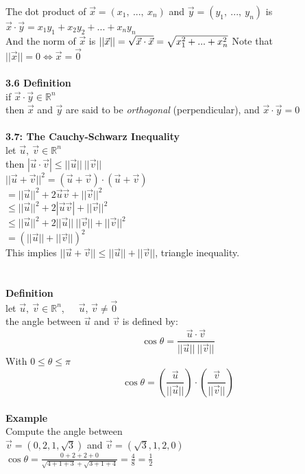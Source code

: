 \documentclass[]{article}
\begin{document}
		The dot product of $\vec{x}=(x_1,~...,~x_n)$ and $\vec{y}=(y_1,~...,~y_n)$ is\\
		$\vec{x}\cdot\vec{y}=x_1y_1+x_2y_2+...+x_ny_n$\\
		And the norm of $\vec{x}$ is $||\vec{x}||=\sqrt{\vec{x}\cdot\vec{x}}\\=\sqrt{x_1^2+...+x_n^2}$
		Note that $||\vec{x}||=0\iff\vec{x}=\vec{0}$\\\\
		{\bf 3.6 Definition}\\
		if $\vec{x}\cdot\vec{y}\in\mathbb{R}^n$\\
		then $\vec{x}$ and $\vec{y}$ are said to be \emph{orthogonal} (perpendicular), and $\vec{x}\cdot\vec{y}=0$\\\\
		{\bf 3.7: The Cauchy-Schwarz Inequality}\\
		let $\vec{u},~\vec{v}\in\mathbb{R}^n$\\
		then $|\vec{u}\cdot\vec{v}|\le||\vec{u}||~||\vec{v}||$\\
		$||\vec{u}+\vec{v}||^2=(\vec{u}+\vec{v})\cdot(\vec{u}+\vec{v})$\\
		$=||\vec{u}||^2+2\vec{u}\vec{v}+||\vec{v}||^2$\\
		$\le||\vec{u}||^2+2|\vec{u}\vec{v}|+||\vec{v}||^2$\\
		$\le||\vec{u}||^2+2||\vec{u}||~||\vec{v}||+||\vec{v}||^2$\\
		$=(||\vec{u}||+||\vec{v}||)^2$\\
		This implies $||\vec{u}+\vec{v}||\le ||\vec{u}||+||\vec{v}||$, triangle inequality.\\\\
		\pagebreak\\
		{\bf Definition}\\
		let $\vec{u},~\vec{v}\in\mathbb{R}^n$,~~~$\vec{u}$, $\vec{v}\ne\vec{0}$\\
		the angle between $\vec{u}$ and $\vec{v}$ is defined by:\\
		$$\cos\theta=\frac{\vec{u}\cdot\vec{v}}{||\vec{u}||~||\vec{v}||}$$
		With $0\le\theta\le\pi$\\
		$$\cos\theta=(\frac{\vec{u}}{||\vec{u}||})\cdot(\frac{\vec{v}}{||\vec{v}||})$$\\
		{\bf Example}\\
		Compute the angle between\\
		$\vec{v}=(0,2,1,\sqrt{3})$ and $\vec{v}=(\sqrt{3},1,2,0)$\\
		$\cos\theta=\frac{0+2+2+0}{\sqrt{4+1+3}+\sqrt{3+1+4}}=\frac{4}{8}=\frac{1}{2}$\\
\end{document}
